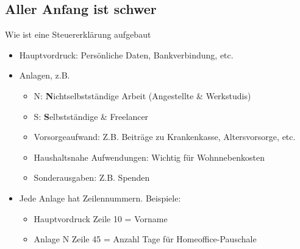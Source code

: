 \documentclass{beamer}
\begin{document}

		\subsection{Aller Anfang ist schwer}

			\begin{frame}{Wie ist eine Steuererklärung aufgebaut}
				\begin{itemize}
					\item Hauptvordruck: Persönliche Daten, Bankverbindung, etc.
					\item Anlagen, z.B.
					\begin{itemize}
						\item N: \textbf{N}ichtselbstständige Arbeit (Angestellte \& Werkstudis)
						\item S: \textbf{S}elbstständige \& Freelancer
						\item Vorsorgeaufwand: Z.B. Beiträge zu Krankenkasse, Altersvorsorge, etc.
						\item Haushaltsnahe Aufwendungen: Wichtig für Wohnnebenkosten
						\item Sonderausgaben: Z.B. Spenden
					\end{itemize}
					\item Jede Anlage hat Zeilennummern. Beispiele:
					\begin{itemize}
						\item Hauptvordruck Zeile 10 = Vorname
						\item Anlage N Zeile 45 = Anzahl Tage für Homeoffice-Pauschale
					\end{itemize}
				\end{itemize}
			\end{frame}
\end{document}
